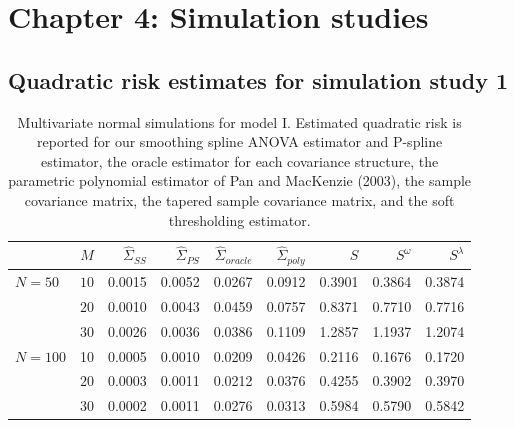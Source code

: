 \section{Chapter 4: Simulation studies}
\subsection{Quadratic risk estimates for simulation study 1}
%
\begin{table}[H]
\centering
\caption{Multivariate normal simulations for model I. Estimated quadratic risk is reported for our smoothing spline ANOVA estimator and P-spline estimator, the oracle estimator for each covariance structure, the parametric polynomial estimator of Pan and MacKenzie (2003), the sample covariance matrix, the tapered sample covariance matrix,
                                    and the soft thresholding estimator.}
\begin{tabular}{lrrrrrrrr}
& $M$ &$\hat{\Sigma}_{SS}$& $\hat{\Sigma}_{PS}$ &$\hat{\Sigma}_{oracle}$& $\hat{\Sigma}_{poly}$ & $S$ &$S^\omega$& $S^\lambda$ \\ 
  \hline
  $N = 50$ & $10$ & 0.0015 & 0.0052 & 0.0267 & 0.0912 & 0.3901 & 0.3864 & 0.3874 \\ 
   & $20$ & 0.0010 & 0.0043 & 0.0459 & 0.0757 & 0.8371 & 0.7710 & 0.7716 \\ 
   & $30$ & 0.0026 & 0.0036 & 0.0386 & 0.1109 & 1.2857 & 1.1937 & 1.2074 \\ 
 $N = 100$ & 10 & 0.0005 & 0.0010 & 0.0209 & 0.0426 & 0.2116 & 0.1676 & 0.1720 \\ 
    &   $20$ & 0.0003 & 0.0011 & 0.0212 & 0.0376 & 0.4255 & 0.3902 & 0.3970 \\ 
    &   $30$ & 0.0002 & 0.0011 & 0.0276 & 0.0313 & 0.5984 & 0.5790 & 0.5842 \\ 
   \hline
\end{tabular} 
\label{table:simulation-1-quad-loss-sigma-1}
\end{table}
